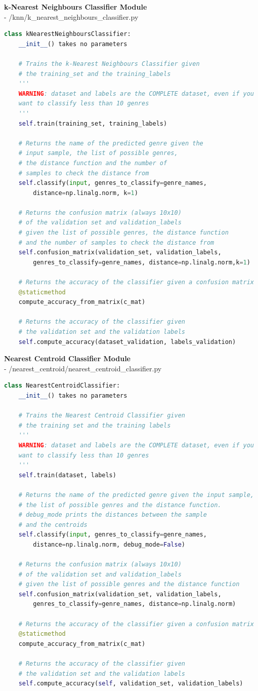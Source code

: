 \documentclass[12pt]{article}
\begin{document}
	\textbf{k-Nearest Neighbours Classifier Module}\mbox{}\\
	- /knn/k\_nearest\_neighbours\_classifier.py
	\begin{lstlisting}[language=Python]
class kNearestNeighboursClassifier:
	__init__() takes no parameters
	
	# Trains the k-Nearest Neighbours Classifier given
	# the training_set and the training_labels
	'''
	WARNING: dataset and labels are the COMPLETE dataset, even if you
	want to classify less than 10 genres
	'''
	self.train(training_set, training_labels)
	
	# Returns the name of the predicted genre given the
	# input sample, the list of possible genres,
	# the distance function and the number of
	# samples to check the distance from
	self.classify(input, genres_to_classify=genre_names, 
		distance=np.linalg.norm, k=1)
	
	# Returns the confusion matrix (always 10x10)
	# of the validation set and validation_labels
	# given the list of possible genres, the distance function
	# and the number of samples to check the distance from
	self.confusion_matrix(validation_set, validation_labels,
		genres_to_classify=genre_names, distance=np.linalg.norm,k=1)
	
	# Returns the accuracy of the classifier given a confusion matrix
	@staticmethod
	compute_accuracy_from_matrix(c_mat)
	
	# Returns the accuracy of the classifier given
	# the validation set and the validation labels
	self.compute_accuracy(dataset_validation, labels_validation)
	\end{lstlisting}
	\newpage
	\textbf{Nearest Centroid Classifier Module}\mbox{}\\
	- /nearest\_centroid/nearest\_centroid\_classifier.py
	\begin{lstlisting}[language=Python]
class NearestCentroidClassifier:
	__init__() takes no parameters	
	
	# Trains the Nearest Centroid Classifier given
	# the training set and the training labels
	'''
	WARNING: dataset and labels are the COMPLETE dataset, even if you
	want to classify less than 10 genres
	'''
	self.train(dataset, labels)
	
	# Returns the name of the predicted genre given the input sample,
	# the list of possible genres and the distance function.
	# debug_mode prints the distances between the sample 
	# and the centroids
	self.classify(input, genres_to_classify=genre_names,
		distance=np.linalg.norm, debug_mode=False)
	
	# Returns the confusion matrix (always 10x10)
	# of the validation set and validation_labels
	# given the list of possible genres and the distance function
	self.confusion_matrix(validation_set, validation_labels,
		genres_to_classify=genre_names, distance=np.linalg.norm)
	
	# Returns the accuracy of the classifier given a confusion matrix
	@staticmethod
	compute_accuracy_from_matrix(c_mat)
	
	# Returns the accuracy of the classifier given
	# the validation set and the validation labels
	self.compute_accuracy(self, validation_set, validation_labels)
	\end{lstlisting}
\end{document}
